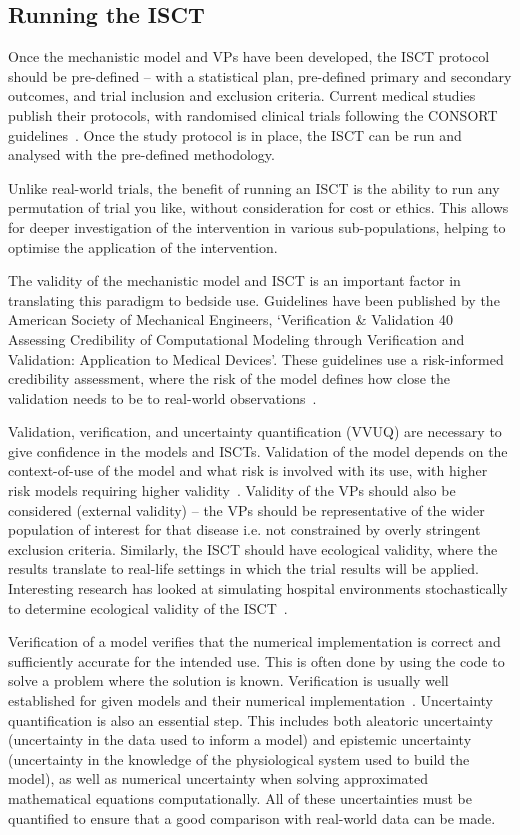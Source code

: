 \documentclass{article}
\begin{document}
\subsection{Running the ISCT}

Once the mechanistic model and VPs have been developed, the ISCT protocol should be pre-defined – with a statistical plan, pre-defined primary and secondary outcomes, and trial inclusion and exclusion criteria. Current medical studies publish their protocols, with randomised clinical trials following the CONSORT guidelines~\cite{Schulz2010}. Once the study protocol is in place, the ISCT can be run and analysed with the pre-defined methodology.

Unlike real-world trials, the benefit of running an ISCT is the ability to run any permutation of trial you like, without consideration for cost or ethics. This allows for deeper investigation of the intervention in various sub-populations, helping to optimise the application of the intervention.

The validity of the mechanistic model and ISCT is an important factor in translating this paradigm to bedside use. Guidelines have been published by the American Society of Mechanical Engineers, `Verification \& Validation 40 Assessing Credibility of Computational Modeling through Verification and Validation: Application to Medical Devices'. These guidelines use a risk-informed credibility assessment, where the risk of the model defines how close the validation needs to be to real-world observations~\cite{ASME2018}.

Validation, verification, and uncertainty quantification (VVUQ) are necessary to give confidence in the models and ISCTs. Validation of the model depends on the context-of-use of the model and what risk is involved with its use, with higher risk models requiring higher validity~\cite{Pappalardo2019}. Validity of the VPs should also be considered (external validity) – the VPs should be representative of the wider population of interest for that disease i.e. not constrained by overly stringent exclusion criteria. Similarly, the ISCT should have ecological validity, where the results translate to real-life settings in which the trial results will be applied. Interesting research has looked at simulating hospital environments stochastically to determine ecological validity of the ISCT~\cite{Fuertinger2018}.

Verification of a model verifies that the numerical implementation is correct and sufficiently accurate for the intended use.
This is often done by using the code to solve a problem where the solution is known.
Verification is usually well established for given models and their numerical implementation~\cite{Curreli2021, Pappalardo2019}. 
Uncertainty quantification is also an essential step. 
This includes both aleatoric uncertainty (uncertainty in the data used to inform a model) and epistemic uncertainty (uncertainty in the knowledge of the physiological system used to build the model), as well as numerical uncertainty when solving approximated mathematical equations computationally. 
All of these uncertainties must be quantified to ensure that a good comparison with real-world data can be made.
\end{document}
